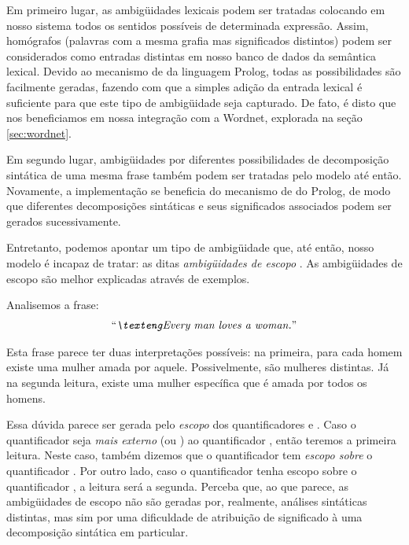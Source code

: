 Em primeiro lugar, as ambigüidades lexicais podem ser tratadas colocando em nosso sistema todos os sentidos possíveis de determinada expressão. Assim, homógrafos (palavras com a mesma grafia mas significados distintos) podem ser considerados como entradas distintas em nosso banco de dados da semântica lexical. Devido ao mecanismo de  da linguagem Prolog, todas as possibilidades são facilmente geradas, fazendo com que a simples adição da entrada lexical é suficiente para que este tipo de ambigüidade seja capturado. De fato, é disto que nos beneficiamos em nossa integração com a Wordnet, explorada na seção \ref{sec:wordnet}.

Em segundo lugar, ambigüidades por diferentes possibilidades de decomposição sintática de uma mesma frase também podem ser tratadas pelo modelo até então. Novamente, a implementação se beneficia do mecanismo de  do Prolog, de modo que diferentes decomposições sintáticas e seus significados associados podem ser gerados sucessivamente.


Entretanto, podemos apontar um tipo de ambigüidade que, até então, nosso modelo é incapaz de tratar: as ditas \textit{ambigüidades de escopo} \citep[p.~105-109]{BlackburnBos:2005}. As ambigüidades de escopo são melhor explicadas através de exemplos.

Analisemos a frase: 
\begin{align*}
\text{\expreng{Every man loves a woman.}}
\end{align*}%

Esta frase parece ter duas interpretações possíveis: na primeira, para cada homem existe uma mulher amada por aquele. Possivelmente, são mulheres distintas. Já na segunda leitura, existe uma mulher específica que é amada por todos os homens.

Essa dúvida parece ser gerada pelo \textit{escopo} dos quantificadores  e . Caso o quantificador  seja \textit{mais externo} (ou \textit{}) ao quantificador , então teremos a primeira leitura. Neste caso, também dizemos que o quantificador  tem \textit{escopo sobre} o quantificador . Por outro lado, caso o quantificador  tenha escopo sobre o quantificador , a leitura será a segunda. Perceba que, ao que parece, as ambigüidades de escopo não são geradas por, realmente, análises sintáticas distintas, mas sim por uma dificuldade de atribuição de significado à uma decomposição sintática em particular. 

